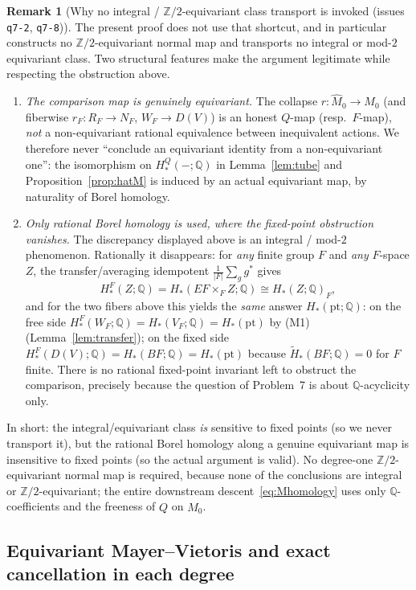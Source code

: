 \documentclass[12pt]{article}
\theoremstyle{definition}
\newtheorem{remark}[theorem]{Remark}
\begin{document}
\begin{remark}[Why no integral / $\mathbb{Z}/2$-equivariant class transport is
invoked (issues \texttt{q7-2}, \texttt{q7-8})]
The present proof does not use that shortcut, and in particular constructs no
$\mathbb{Z}/2$-equivariant normal map and transports no integral or mod-$2$
equivariant class. Two structural features make the argument legitimate while
respecting the obstruction above.
\begin{enumerate}
\item[\textup{(i)}] \emph{The comparison map is genuinely equivariant.} The
collapse $r\colon\widehat M_0\to M_0$ (and fiberwise $r_F\colon R_F\to N_F$,
$W_F\to D(V)$) is an honest $Q$-map (resp.\ $F$-map), \emph{not} a
non-equivariant rational equivalence between inequivalent actions. We therefore
never ``conclude an equivariant identity from a non-equivariant one'': the
isomorphism on $H^Q_*(-;\mathbb{Q})$ in Lemma~\ref{lem:tube} and
Proposition~\ref{prop:hatM} is induced by an actual equivariant map, by
naturality of Borel homology.
\item[\textup{(ii)}] \emph{Only \emph{rational} Borel homology is used, where the
fixed-point obstruction vanishes.} The discrepancy displayed above is an integral
/ mod-$2$ phenomenon. Rationally it disappears: for \emph{any} finite group $F$
and \emph{any} $F$-space $Z$, the transfer/averaging idempotent
$\tfrac1{|F|}\sum_{g}g^*$ gives
\[
   H^F_*(Z;\mathbb{Q})=H_*(EF\times_F Z;\mathbb{Q})\cong
   H_*(Z;\mathbb{Q})_F ,
\]
and for the two fibers above this yields the \emph{same} answer $H_*(\mathrm{pt};
\mathbb{Q})$: on the free side $H^F_*(W_F;\mathbb{Q})=H_*(V_F;\mathbb{Q})=
H_*(\mathrm{pt})$ by (M1) (Lemma~\ref{lem:transfer}); on the fixed side
$H^F_*(D(V);\mathbb{Q})=H_*(BF;\mathbb{Q})=H_*(\mathrm{pt})$ because
$\widetilde H_*(BF;\mathbb{Q})=0$ for $F$ finite. There is no rational
fixed-point invariant left to obstruct the comparison, precisely because the
question of Problem~7 is about $\mathbb{Q}$-acyclicity only.
\end{enumerate}
In short: the integral/equivariant class \emph{is} sensitive to fixed points
(so we never transport it), but the rational Borel homology along a genuine
equivariant map is insensitive to fixed points (so the actual argument is valid).
No degree-one $\mathbb{Z}/2$-equivariant normal map is required, because none of
the conclusions are integral or $\mathbb{Z}/2$-equivariant; the entire downstream
descent~\eqref{eq:Mhomology} uses only $\mathbb{Q}$-coefficients and the freeness
of $Q$ on $\widehat M_0$.
\end{remark}


\subsection{Equivariant Mayer--Vietoris and exact cancellation in each degree}
\label{sec:MVcollapse}
\end{document}
